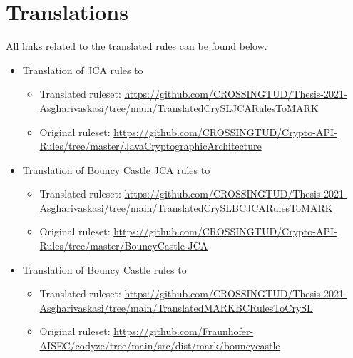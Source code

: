 \section{Translations} 
\label{appendix:ruletranslaions}
All links related to the translated rules can be found below.


\begin{itemize}
    \item Translation of JCA \crysl{} rules to \MARK{}
        \begin{itemize}
        \item Translated ruleset: \url{https://github.com/CROSSINGTUD/Thesis-2021-Asgharivaskasi/tree/main/TranslatedCrySLJCARulesToMARK}
        \item Original ruleset: \url{https://github.com/CROSSINGTUD/Crypto-API-Rules/tree/master/JavaCryptographicArchitecture}
        \end{itemize}
    \item Translation of Bouncy Castle JCA \crysl{} rules to \MARK{}
        \begin{itemize}
        \item Translated ruleset: \url{https://github.com/CROSSINGTUD/Thesis-2021-Asgharivaskasi/tree/main/TranslatedCrySLBCJCARulesToMARK}
        \item Original ruleset: \url{https://github.com/CROSSINGTUD/Crypto-API-Rules/tree/master/BouncyCastle-JCA}
        \end{itemize}
    \item Translation of Bouncy Castle \MARK{} rules to \crysl{}
        \begin{itemize}
        \item Translated ruleset: \url{https://github.com/CROSSINGTUD/Thesis-2021-Asgharivaskasi/tree/main/TranslatedMARKBCRulesToCrySL}
        \item Original ruleset: \url{https://github.com/Fraunhofer-AISEC/codyze/tree/main/src/dist/mark/bouncycastle}
        \end{itemize}    
        
\end{itemize}
